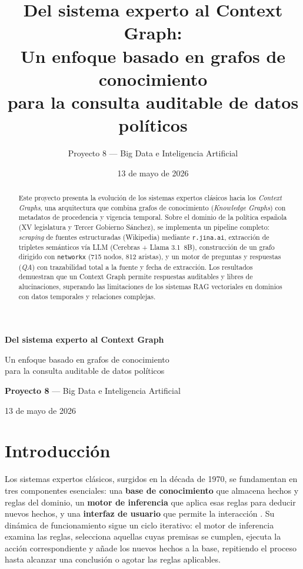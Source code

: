 \documentclass[12pt,a4paper]{article}
\title{Del sistema experto al Context Graph:\\Un enfoque basado en grafos de conocimiento\\para la consulta auditable de datos políticos}
\author{Proyecto 8 --- Big Data e Inteligencia Artificial}
\date{13 de mayo de 2026}
\begin{document}
\begin{titlepage}
\centering
\vspace*{2cm}

{\LARGE\bfseries Del sistema experto al Context Graph\par}
\vspace{0.3cm}
{\Large Un enfoque basado en grafos de conocimiento\\para la consulta auditable de datos políticos\par}

\vspace{1.5cm}

{\large\textbf{Proyecto 8} --- Big Data e Inteligencia Artificial\par}

\vspace{0.5cm}
{\large 13 de mayo de 2026}

\vspace{3cm}

\begin{abstract}
Este proyecto presenta la evolución de los sistemas expertos clásicos hacia los \textit{Context Graphs}, una arquitectura que combina grafos de conocimiento (\textit{Knowledge Graphs}) con metadatos de procedencia y vigencia temporal. Sobre el dominio de la política española (XV legislatura y Tercer Gobierno Sánchez), se implementa un pipeline completo: \textit{scraping} de fuentes estructuradas (Wikipedia) mediante \texttt{r.jina.ai}, extracción de tripletes semánticos vía LLM (Cerebras + Llama 3.1~8B), construcción de un grafo dirigido con \texttt{networkx} (715 nodos, 812 aristas), y un motor de preguntas y respuestas (\textit{QA}) con trazabilidad total a la fuente y fecha de extracción. Los resultados demuestran que un Context Graph permite respuestas auditables y libres de alucinaciones, superando las limitaciones de los sistemas RAG vectoriales en dominios con datos temporales y relaciones complejas.
\end{abstract}
\end{titlepage}

\tableofcontents
\newpage

\section{Introducción}
\label{sec:intro}

Los sistemas expertos clásicos, surgidos en la d\'ecada de 1970, se fundamentan en tres componentes esenciales: una \textbf{base de conocimiento} que almacena hechos y reglas del dominio, un \textbf{motor de inferencia} que aplica esas reglas para deducir nuevos hechos, y una \textbf{interfaz de usuario} que permite la interacci\'on \cite{hogan2021kg}. Su din\'amica de funcionamiento sigue un ciclo iterativo: el motor de inferencia examina las reglas, selecciona aquellas cuyas premisas se cumplen, ejecuta la acci\'on correspondiente y a\~nade los nuevos hechos a la base, repitiendo el proceso hasta alcanzar una conclusi\'on o agotar las reglas aplicables.
\end{document}
